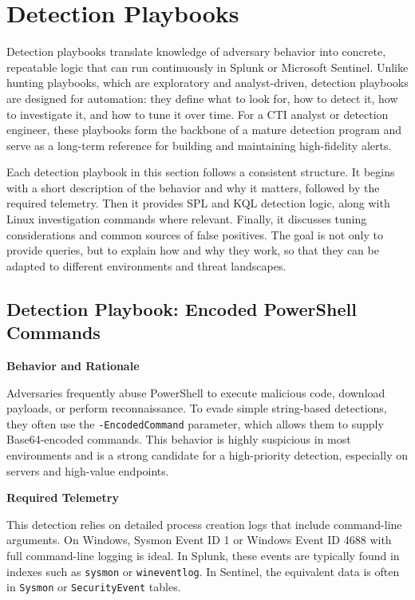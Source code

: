 \section{Detection Playbooks}

Detection playbooks translate knowledge of adversary behavior into concrete, repeatable logic that can run continuously in Splunk or Microsoft Sentinel. Unlike hunting playbooks, which are exploratory and analyst-driven, detection playbooks are designed for automation: they define what to look for, how to detect it, how to investigate it, and how to tune it over time. For a CTI analyst or detection engineer, these playbooks form the backbone of a mature detection program and serve as a long-term reference for building and maintaining high-fidelity alerts.

Each detection playbook in this section follows a consistent structure. It begins with a short description of the behavior and why it matters, followed by the required telemetry. Then it provides SPL and KQL detection logic, along with Linux investigation commands where relevant. Finally, it discusses tuning considerations and common sources of false positives. The goal is not only to provide queries, but to explain how and why they work, so that they can be adapted to different environments and threat landscapes.

\subsection*{Detection Playbook: Encoded PowerShell Commands}

\textbf{Behavior and Rationale}

Adversaries frequently abuse PowerShell to execute malicious code, download payloads, or perform reconnaissance. To evade simple string-based detections, they often use the \texttt{-EncodedCommand} parameter, which allows them to supply Base64-encoded commands. This behavior is highly suspicious in most environments and is a strong candidate for a high-priority detection, especially on servers and high-value endpoints.

\textbf{Required Telemetry}

This detection relies on detailed process creation logs that include command-line arguments. On Windows, Sysmon Event ID 1 or Windows Event ID 4688 with full command-line logging is ideal. In Splunk, these events are typically found in indexes such as \texttt{sysmon} or \texttt{wineventlog}. In Sentinel, the equivalent data is often in \texttt{Sysmon} or \texttt{SecurityEvent} tables.

